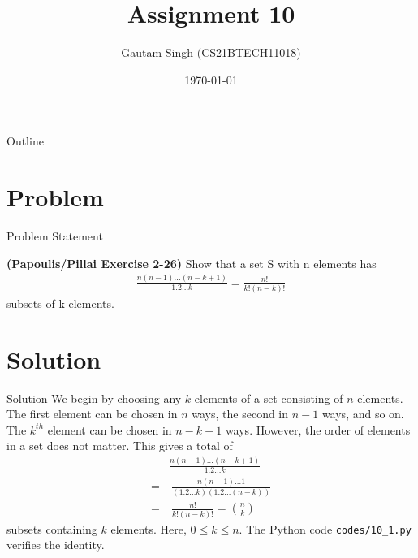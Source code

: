 \documentclass{beamer}
\title{Assignment 10}
\author{Gautam Singh (CS21BTECH11018)}
\date{\today}
\begin{document}
\begin{frame}
    \titlepage 
\end{frame}

\begin{frame}{Outline}
    \tableofcontents
\end{frame}


\section{Problem}
\begin{frame}{Problem Statement}

\textbf{(Papoulis/Pillai Exercise 2-26)} Show that a set S with n elements has
\begin{align}
    \frac{n(n - 1)\ldots(n - k + 1)}{1.2{\ldots}k} = \frac{n!}{k!(n - k)!}
\end{align}
subsets of k elements.

\end{frame}


\section{Solution}

\begin{frame}{Solution}
    We begin by choosing any $k$ elements of a set consisting of $n$ elements. The first element can be chosen in $n$ ways, the second in $n - 1$ ways, and so on. The $k^{th}$ element can be chosen in $n - k + 1$ ways. However, the order of elements in a set does not matter. This gives a total of
    \begin{align}
        &\frac{n(n - 1)\ldots(n - k + 1)}{1.2{\ldots}k} \\
        =&\ \frac{n(n - 1){\ldots}1}{(1.2{\ldots}k)(1.2{\ldots}(n - k))} \\
        =&\ \frac{n!}{k!(n - k)!} = \binom{n}{k} 
        \label{eq:proof}
    \end{align}
    subsets containing $k$ elements. Here, $0 \leq k \leq n$. The Python code \texttt{codes/10\_1.py} verifies the identity.
\end{frame}
\end{document}
